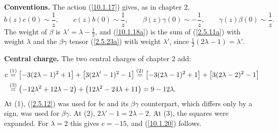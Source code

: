 \begin{tcolorbox}[breakable]
	\begin{remark}
		\textbf{Conventions.} The action (\ref{10.1.17}) gives, as in chapter 2,
		\begin{equation*}
			b(z)c(0)\sim\frac{1}{z},\qquad c(z)b(0)\sim\frac{1}{z},\qquad \beta(z)\gamma(0)\sim-\frac{1}{z},\qquad \gamma(z)\beta(0)\sim\frac{1}{z}.
		\end{equation*}
		The weight of $\beta$ is $\lambda'=\lambda-\tfrac12$, and (\ref{10.1.18a}) is the sum of (\ref{2.5.11a}) with weight $\lambda$ and the $\beta\gamma$ tensor (\ref{2.5.23a}) with weight $\lambda'$, since $\tfrac12(2\lambda-1)=\lambda'$.

		\textbf{Central charge.} The two central charges of chapter 2 add:
		\begin{align*}
			c&\overset{(1)}{=}\bigl[-3(2\lambda-1)^{2}+1\bigr]+\bigl[3(2\lambda'-1)^{2}-1\bigr]
			\overset{(2)}{=}\bigl[-3(2\lambda-1)^{2}+1\bigr]+\bigl[3(2\lambda-2)^{2}-1\bigr]\\
			&\overset{(3)}{=}\bigl(-12\lambda^{2}+12\lambda-2\bigr)+\bigl(12\lambda^{2}-24\lambda+11\bigr)=9-12\lambda .
		\end{align*}
		At (1), (\ref{2.5.12}) was used for $bc$ and its $\beta\gamma$ counterpart, which differs only by a sign, was used for $\beta\gamma$. At (2), $2\lambda'-1=2\lambda-2$. At (3), the squares were expanded. For $\lambda=2$ this gives $c=-15$, and (\ref{10.1.20}) follows.


\end{remark}
\end{tcolorbox}
